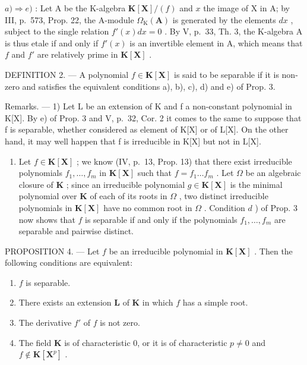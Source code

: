 \(a) \Rightarrow e)\) : Let A be the K-algebra \(\mathbf{K}[\mathbf{X}] / (f)\) and \(x\) the image of X in A; by III, p.~573, Prop. 22, the A-module \(\Omega_{\mathrm{K}}(\mathbf{A})\) is generated by the elements \(dx\) , subject to the single relation \(f'(x) dx = 0\) . By V, p.~33, Th. 3, the K-algebra A is thus etale if and only if \(f'(x)\) is an invertible element in A, which means that \(f\) and \(f'\) are relatively prime in \(\mathbf{K}[\mathbf{X}]\) .

DEFINITION 2. --- A polynomial \(f \in \mathbf{K}[\mathbf{X}]\) is said to be separable if it is non-zero and satisfies the equivalent conditions a), b), c), d) and e) of Prop. 3.

Remarks. --- 1) Let L be an extension of K and f a non-constant polynomial in K{[}X{]}. By e) of Prop. 3 and V, p.~32, Cor. 2 it comes to the same to suppose that f is separable, whether considered as element of K{[}X{]} or of L{[}X{]}. On the other hand, it may well happen that f is irreducible in K{[}X{]} but not in L{[}X{]}.

\begin{enumerate}
\def\labelenumi{\arabic{enumi})}
\setcounter{enumi}{1}
\tightlist
\item
  Let \(f \in \mathbf{K}[\mathbf{X}]\) ; we know (IV, p.~13, Prop. 13) that there exist irreducible polynomials \(f_1, \ldots, f_m\) in \(\mathbf{K}[\mathbf{X}]\) such that \(f = f_1 \ldots f_m\) . Let \(\Omega\) be an algebraic closure of \(\mathbf{K}\) ; since an irreducible polynomial \(g \in \mathbf{K}[\mathbf{X}]\) is the minimal polynomial over \(\mathbf{K}\) of each of its roots in \(\Omega\) , two distinct irreducible polynomials in \(\mathbf{K}[\mathbf{X}]\) have no common root in \(\Omega\) . Condition \(d\) ) of Prop. 3 now shows that \(f\) is separable if and only if the polynomials \(f_1, \ldots, f_m\) are separable and pairwise distinct.
\end{enumerate}

PROPOSITION 4. --- Let \(f\) be an irreducible polynomial in \(\mathbf{K}[\mathbf{X}]\) . Then the following conditions are equivalent:

\begin{enumerate}
\def\labelenumi{\alph{enumi})}
\item
  \(f\) is separable.
\item
  There exists an extension \(\mathbf{L}\) of \(\mathbf{K}\) in which \(f\) has a simple root.
\item
  The derivative \(f'\) of \(f\) is not zero.
\item
  The field \(\mathbf{K}\) is of characteristic 0, or it is of characteristic \(p \neq 0\) and \(f \notin \mathbf{K}[\mathbf{X}^p]\) .
\end{enumerate}

